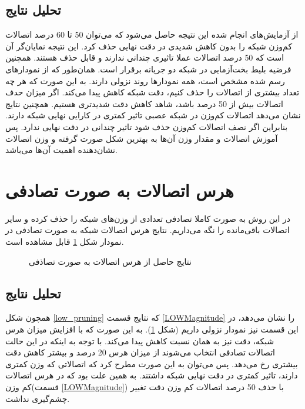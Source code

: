\subsection{تحلیل نتایج}
از آزمایش‌های انجام شده این نتیجه حاصل می‌شود که می‌توان 50 تا 60 درصد اتصالات کم‌وزن شبکه 
را بدون کاهش شدیدی در دقت نهایی حذف کرد. این نتیجه نمایان‌گر آن است که 50 درصد اتصالات عملا تاثیری چندانی ندارند و قابل حذف هستند. همچنین فرضیه بلیط بخت‌آزمایی در شبکه دو جریانه
برقرار است.
همان‌طور که از نمودار‌های رسم شده مشخص است، همه نمودار‌ها روند نزولی دارند. به این صورت که هر چه تعداد بیشتری از اتصالات را حذف کنیم، دقت شبکه کاهش پیدا می‌کند. اگر میزان حدف اتصالات بیش از 50 درصد باشد، شاهد کاهش دقت شدیدتری هستیم.
\newline
همچنین نتایج نشان می‌دهد اتصالات کم‌وزن در شبکه عصبی تاثیر کمتری در کارایی نهایی شبکه دارند. بنابراین اگر نصف اتصالات کم‌وزن حذف شود تاثیر چندانی در دقت نهایی ندارد. پس آموزش اتصالات و مقدار وزن آن‌ها به بهترین شکل صورت گرفته و وزن اتصالات نشان‌دهنده اهمیت آن‌ها می‌باشد.

\section{هرس اتصالات به صورت تصادفی}

	در این روش به صورت کاملا تصادفی تعدادی از وزن‌های شبکه را حذف کرده و سایر اتصالات باقی‌مانده را نگه می‌داریم. نتایج هرس اتصالات شبکه
	به صورت تصادفی در نمودار شکل \ref{random_pruning} قابل مشاهده است.
	
	
\begin{figure}[H]		  		    
	\caption{نتایج حاصل از هرس اتصالات به صورت تصاذفی}
	\label{random_pruning}
\end{figure}
\subsection{تحلیل نتایج}	
همچون شکل \ref{low_pruning} که نتایج قسمت \ref{LOWMagnitude} را نشان می‌دهد، در این قسمت نیز نمودار نزولی داریم (شکل \ref{random_pruning}). به این صورت که با افزایش میزان هرس شبکه، دقت نیز به همان نسبت کاهش پیدا می‌کند. با توجه به اینکه در این حالت اتصالات تصادفی انتخاب می‌شوند از میزان هرس 20 درصد و بیشتر کاهش دقت بیشتری رخ می‌دهد. پس می‌توان به این صورت مطرح کرد که اتصالاتی که وزن کمتری دارند، تاثیر کمتری در دقت نهایی شبکه داشتند. به همین علت بود که در هرس اتصالات کم وزن(قسمت \ref{LOWMagnitude}) با حذف 50 درصد اتصالات کم وزن دقت تغییر چشم‌گیری نداشت.

